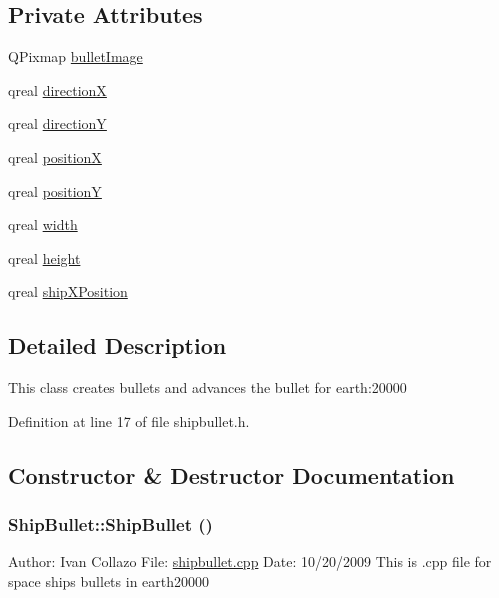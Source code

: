 \subsection*{Private Attributes}
\begin{DoxyCompactItemize}
\item 
QPixmap \hyperlink{class_ship_bullet_a22ad763541149d9823794297307b5a63}{bulletImage}
\item 
qreal \hyperlink{class_ship_bullet_a5f2086fa76ca48a99e7b6b53592b9ab0}{directionX}
\item 
qreal \hyperlink{class_ship_bullet_a091f76850ba260f2a306d5dc7e69bd1b}{directionY}
\item 
qreal \hyperlink{class_ship_bullet_a24067ecee3430c3094aeee3a5de4740b}{positionX}
\item 
qreal \hyperlink{class_ship_bullet_a65c6f482103ca4c3e90648829e8cac5d}{positionY}
\item 
qreal \hyperlink{class_ship_bullet_a13d7785c8b0cb473a16fa5c9e82f3911}{width}
\item 
qreal \hyperlink{class_ship_bullet_a481df890ebe98e14a9fed36020a5e265}{height}
\item 
qreal \hyperlink{class_ship_bullet_a3af7e87f7c4e261da57f5fe73c41094f}{shipXPosition}
\end{DoxyCompactItemize}


\subsection{Detailed Description}
This class creates bullets and advances the bullet for earth:20000 

Definition at line 17 of file shipbullet.h.

\subsection{Constructor \& Destructor Documentation}
\hypertarget{class_ship_bullet_a1cce0c8b6a00a834e18f709b44e787d5}{
\subsubsection[{ShipBullet}]{\setlength{\rightskip}{0pt plus 5cm}ShipBullet::ShipBullet ()}}
\label{class_ship_bullet_a1cce0c8b6a00a834e18f709b44e787d5}
Author: Ivan Collazo File: \hyperlink{shipbullet_8cpp}{shipbullet.cpp} Date: 10/20/2009 This is .cpp file for space ships bullets in earth20000

